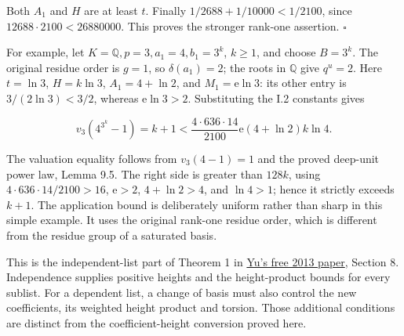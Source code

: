 \documentclass[
  11pt,
  a4paper,
]{article}
\begin{document}
Both \(A_1\) and \(H\) are at least \(t\). Finally
\(1/2688+1/10000<1/2100\), since \(12688\cdot2100<26880000\). This
proves the stronger rank-one assertion. \(\square\)

For example, let \(K=\mathbb Q,p=3,a_1=4,b_1=3^k\), \(k\ge1\), and
choose \(B=3^k\). The original residue order is \(g=1\), so
\(\delta(a_1)=2\); the roots in \(\mathbb Q\) give \(q^u=2\). Here
\(t=\ln3\), \(H=k\ln3\), \(A_1=4+\ln2\), and \(M_1=\mathrm e\ln3\): its
other entry is \(3/(2\ln3)<3/2\), whereas \(\mathrm e\ln3>2\).
Substituting the I.2 constants gives

\[
v_3(4^{3^k}-1)=k+1
<\frac{4\cdot636\cdot14}{2100}
  \mathrm e(4+\ln2)k\ln4.
\tag{10.469}
\]

The valuation equality follows from \(v_3(4-1)=1\) and the proved
deep-unit power law, Lemma 9.5. The right side is greater than \(128k\),
using \(4\cdot636\cdot14/2100>16\), \(\mathrm e>2\), \(4+\ln2>4\), and
\(\ln4>1\); hence it strictly exceeds \(k+1\). The application bound is
deliberately uniform rather than sharp in this simple example. It uses
the original rank-one residue order, which is different from the residue
group of a saturated basis.

This is the independent-list part of Theorem 1 in
\href{https://archive.ymsc.tsinghua.edu.cn/pacm_download/117/6782-11511_2013_Article_106.pdf}{Yu's
free 2013 paper}, Section 8. Independence supplies positive heights and
the height-product bounds for every sublist. For a dependent list, a
change of basis must also control the new coefficients, its weighted
height product and torsion. Those additional conditions are distinct
from the coefficient-height conversion proved here.
\end{document}

